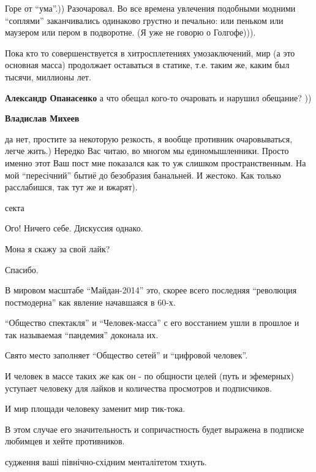 \begin{itemize}

Горе от \enquote{ума}.)) Разочаровал. Во все времена увлечения подобными модними
\enquote{соплями} заканчивались одинаково грустно и печально: или пеньком или маузером
или пером в подворотне. (Я уже не говорю о Голгофе))).

Пока кто то совершенствуется в хитросплетениях умозаключений, мир (а это
основная масса) продолжает оставаться в статике, т.е. таким же, каким был
тысячи, миллионы лет.

\begin{itemize} %
\textbf{Александр Опанасенко} а что обещал кого-то очаровать и нарушил обещание? ))

\textbf{Владислав Михеев} 

да нет, простите за некоторую резкость, я вообще противник очаровываться, легче
жить.) Нередко Вас читаю, во многом мы единомышленники. Просто именно этот Ваш
пост мне показался как то уж слишком пространственным. На мой \enquote{пересічний}
бытиё до безобразия банальней. И жестоко. Как только расслабишся, так тут же и
вжарят).

\end{itemize} %

секта


Ого! Ничего себе. Дискуссия однако.

Мона я скажу за свой лайк?

Спасибо.

В мировом масштабе \enquote{Майдан-2014} это, скорее всего последняя
\enquote{революция постмодерна} как явление начавшаяся в 60-х.

\enquote{Общество спектакля} и \enquote{Человек-масса} с его восстанием ушли в
прошлое и так называемая \enquote{пандемия} доконала их.

Свято место заполняет \enquote{Общество сетей} и \enquote{цифровой человек}.

И человек в массе таких же как он - по общности целей (путь и эфемерных)
уступает человеку для лайков и количества просмотров и подписчиков.

И мир площади человеку заменит мир тик-тока.

В этом случае его значительность и сопричастность будет выражена в подписке
любимцев и хейте противников.


судження ваші північно-східним менталітетом тхнуть.


\end{itemize}
